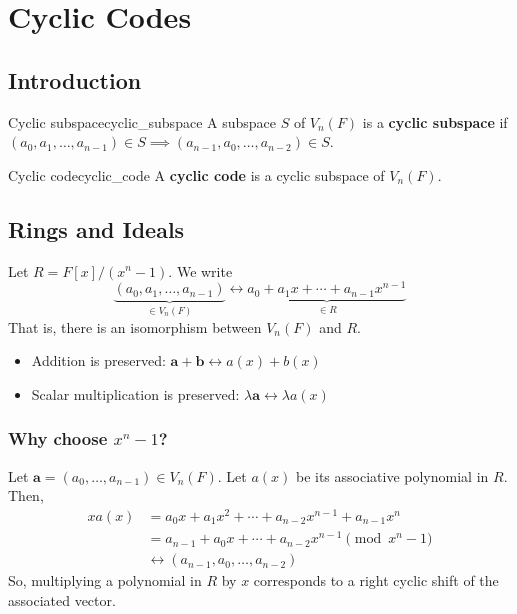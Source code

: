 \chapter{Cyclic Codes}
\section{Introduction}

\begin{Definition}{Cyclic subspace}{cyclic_subspace}
    A subspace $ S $ of $ V_n(F) $ is a \textbf{cyclic subspace}
    if $ (a_0,a_1,\ldots ,a_{n-1})\in S\implies
        (a_{n-1},a_0,\ldots , a_{n-2})\in S $.
\end{Definition}

\begin{Definition}{Cyclic code}{cyclic_code}
    A \textbf{cyclic code} is a cyclic subspace of $ V_n(F) $.
\end{Definition}

\section{Rings and Ideals}

Let $ R=F[x]/(x^n-1) $. We write
\[ \underbrace{(a_0,a_1,\ldots ,a_{n-1})}_{\in V_n(F)}
    \longleftrightarrow \underbrace{{a_0+a_1x+\cdots+a_{n-1}}x^{n-1}}_{\in R} \]
That is, there is an isomorphism between $ V_n(F) $ and $ R $.
\begin{itemize}
    \item Addition is preserved: $ \symbf{a}+\symbf{b}\longleftrightarrow a(x)+b(x) $
    \item Scalar multiplication is preserved: $ \lambda\symbf{a} \longleftrightarrow \lambda a(x) $
\end{itemize}
\subsection*{Why choose $ x^n -1$?}
Let $ \symbf{a}=(a_0,\ldots ,a_{n-1})\in V_n(F) $. Let $ a(x) $ be its associative
polynomial in $ R $. Then,
\begin{align*}
    x a(x)
     & =a_0x+a_1x^2+\cdots+a_{n-2}x^{n-1}+a_{n-1}x^n     \\
     & =a_{n-1}+a_0x+\cdots+a_{n-2}x^{n-1} \pmod{x^n -1} \\
     & \longleftrightarrow (a_{n-1},a_0,\ldots ,a_{n-2})
\end{align*}
So, multiplying a polynomial in $ R $ by $ x $ corresponds
to a right cyclic shift of the associated vector.

